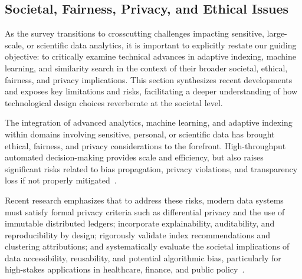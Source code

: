 \documentclass[sigconf]{acmart}
\begin{document}
\subsection{Societal, Fairness, Privacy, and Ethical Issues}

As the survey transitions to crosscutting challenges impacting sensitive, large-scale, or scientific data analytics, it is important to explicitly restate our guiding objective: to critically examine technical advances in adaptive indexing, machine learning, and similarity search in the context of their broader societal, ethical, fairness, and privacy implications. This section synthesizes recent developments and exposes key limitations and risks, facilitating a deeper understanding of how technological design choices reverberate at the societal level.

The integration of advanced analytics, machine learning, and adaptive indexing within domains involving sensitive, personal, or scientific data has brought ethical, fairness, and privacy considerations to the forefront. High-throughput automated decision-making provides scale and efficiency, but also raises significant risks related to bias propagation, privacy violations, and transparency loss if not properly mitigated~\cite{ref16,ref17,ref18,ref20,ref31,ref32,ref33,ref34,ref35,ref36,ref38,ref39,ref40,ref41,ref42,ref43,ref44,ref45}. 

Recent research emphasizes that to address these risks, modern data systems must satisfy formal privacy criteria such as differential privacy and the use of immutable distributed ledgers; incorporate explainability, auditability, and reproducibility by design; rigorously validate index recommendations and clustering attributions; and systematically evaluate the societal implications of data accessibility, reusability, and potential algorithmic bias, particularly for high-stakes applications in healthcare, finance, and public policy~\cite{ref16,ref34,ref43,ref66}.
\end{document}
